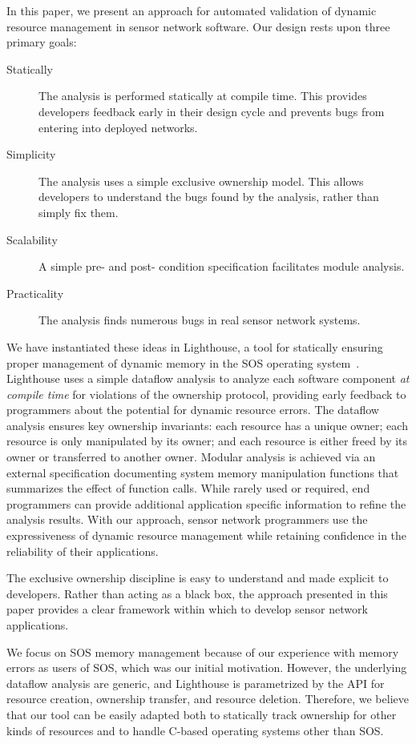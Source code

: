 In this paper, we present an approach for automated validation of dynamic
resource management in sensor network software.  
%
Our design rests upon three primary goals:
%
\begin{description}
%
\item[Statically] The analysis is performed statically at compile time.  This
provides developers feedback early in their design cycle and prevents bugs
from entering into deployed networks.
%
\item[Simplicity]  The analysis uses a simple exclusive ownership model.
%
This allows developers to understand the bugs found by the analysis, rather
than simply fix them.
%
\item[Scalability]  A simple pre- and post- condition specification
facilitates module analysis.
%
\item[Practicality] The analysis finds numerous bugs in real sensor network
systems.
%
\end{description}
%



We have instantiated these ideas in Lighthouse, a tool for statically
ensuring proper management of dynamic memory in the SOS operating
system~\cite{sos}.  
%
Lighthouse uses a simple dataflow analysis to analyze each software
component {\em at compile time} for violations of the ownership protocol,
providing early feedback to programmers about the potential for dynamic
resource errors.  
%
The dataflow analysis ensures key ownership invariants:  each resource has a
unique owner; each resource is only manipulated by its owner; and each
resource is either freed by its owner or transferred to another owner.  
%
Modular analysis is achieved via an external specification documenting
system memory manipulation functions that summarizes the effect of function
calls.
%
While rarely used or required, end programmers can provide additional
application specific information to refine the analysis results.
%
With our approach, sensor network programmers use the expressiveness of
dynamic resource management while retaining confidence in the reliability of
their applications.



The exclusive ownership discipline is easy to understand and made explicit to
developers.
%
Rather than acting as a black box, the approach presented in this paper
provides a clear framework within which to develop sensor network
applications.


We focus on SOS memory management because of our experience with memory
errors as users of SOS, which was our initial motivation.  
%
However, the underlying dataflow analysis are generic, and Lighthouse is
parametrized by the API for resource creation, ownership transfer, and
resource deletion.  
%
Therefore, we believe that our tool can be easily adapted both to statically
track ownership for other kinds of resources and to handle C-based operating
systems other than SOS.


